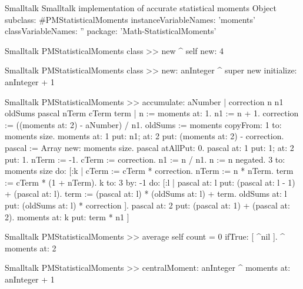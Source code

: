 \begin{listing}[label=lst:genmoments]{Smalltalk}
{Smalltalk implementation of accurate statistical moments}
Object subclass: #PMStatisticalMoments
   instanceVariableNames: 'moments'
   classVariableNames: ''
   package: 'Math-StatisticalMoments'
\end{listing}

\begin{displaycode}{Smalltalk}
PMStatisticalMoments class >> new
    ^ self new: 4
\end{displaycode}

\begin{displaycode}{Smalltalk}
PMStatisticalMoments class >> new: anInteger
    ^ super new initialize: anInteger + 1
\end{displaycode}

\begin{displaycode}{Smalltalk}
PMStatisticalMoments >> accumulate: aNumber
    | correction n n1 oldSums pascal nTerm cTerm term |
    n := moments at: 1.
    n1 := n + 1.
    correction := ((moments at: 2) - aNumber) / n1.
    oldSums := moments copyFrom: 1 to: moments size.
    moments
        at: 1 put: n1;
        at: 2 put: (moments at: 2) - correction.
    pascal := Array new: moments size.
    pascal atAllPut: 0.
    pascal
        at: 1 put: 1;
        at: 2 put: 1.
    nTerm := -1.
    cTerm := correction.
    n1 := n / n1.
    n := n negated.
    3 to: moments size
        do: 
            [:k | 
            cTerm := cTerm * correction.
            nTerm := n * nTerm.
            term := cTerm * (1 + nTerm).
            k to: 3
                by: -1
                do: 
                    [:l | 
                    pascal at: l put: (pascal at: l - 1) + (pascal 
                                                               at: l).
                    term := (pascal at: l) * (oldSums at: l) + term.
                    oldSums at: l put: (oldSums at: l) * correction ].
            pascal at: 2 put: (pascal at: 1) + (pascal at: 2).
            moments at: k put: term * n1 ]
\end{displaycode}

\begin{displaycode}{Smalltalk}
PMStatisticalMoments >> average
    self count = 0 ifTrue: [ ^nil ].
    ^ moments at: 2
\end{displaycode}

\begin{displaycode}{Smalltalk}
PMStatisticalMoments >> centralMoment: anInteger
    ^ moments at: anInteger + 1
\end{displaycode}

